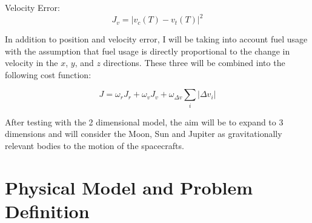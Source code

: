 \documentclass[11pt,letterpaper]{article}
\newcommand{\abs}[1]{\left\lvert#1\right\rvert}
\begin{document}
Velocity Error: 
\begin{equation}
J_v = \abs{v_c(T) - v_t(T)}^2
\label{eq:velocity_error}
\end{equation}

In addition to position and velocity error, I will be taking into account fuel usage with the assumption that fuel usage is directly proportional to the change in velocity
in the $x$, $y$, and $z$ directions. These three will be combined into the following cost function:

\begin{equation}
J = \omega_{r}J_{r} + \omega_{v}J_{v} + \omega_{\Delta v}\sum_{i} \abs{\Delta v_i}
\label{eq:cost_function}
\end{equation}

After testing with the 2 dimensional model, the aim will be to expand to 3 dimensions and will consider the Moon, Sun and Jupiter as
gravitationally relevant bodies to the motion of the spacecrafts.

\section{Physical Model and Problem Definition}
\end{document}
